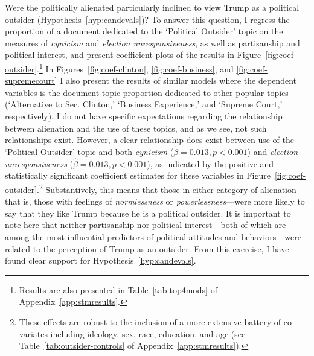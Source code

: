 \documentclass[12pt]{article}
\begin{document}
Were the politically alienated particularly inclined to view Trump as a political outsider (Hypothesis~\ref{hyp:candevals})? To answer this question, I regress the proportion of a document dedicated to the `Political Outsider' topic on the measures of \textit{cynicism} and \textit{election unresponsiveness}, as well as partisanship and political interest, and present coefficient plots of the results in Figure~\ref{fig:coef-outsider}.\footnote{Results are also presented in Table~\ref{tab:top4mods} of Appendix~\ref{app:stmresults}.} In Figures~\ref{fig:coef-clinton}, \ref{fig:coef-business}, and \ref{fig:coef-supremecourt} I also present the results of similar models where the dependent variables is the document-topic proportion dedicated to other popular topics (`Alternative to Sec. Clinton,' `Business Experience,' and `Supreme Court,' respectively). I do not have specific expectations regarding the relationship between alienation and the use of these topics, and as we see, not such relationships exist. However, a clear relationship does exist between use of the `Political Outsider' topic and both \textit{cynicism} ($\hat{\beta} = 0.013, p < 0.001$) and \textit{election unresponsiveness} ($\hat{\beta} = 0.013, p < 0.001$), as indicated by the positive and statistically significant coefficient estimates for these variables in Figure~\ref{fig:coef-outsider}.\footnote{These effects are robust to the inclusion of a more extensive battery of co-variates including ideology, sex, race, education, and age (see Table~\ref{tab:outsider-controls} of Appendix~\ref{app:stmresults}).} Substantively, this means that those in either category of alienation---that is, those with feelings of \textit{normlessness} or \textit{powerlessness}---were more likely to say that they like Trump because he is a political outsider. It is important to note here that neither partisanship nor political interest---both of which are among the most influential predictors of political attitudes and behaviors---were related to the perception of Trump as an outsider. From this exercise, I have found clear support for Hypothesis~\ref{hyp:candevals}.
\end{document}
